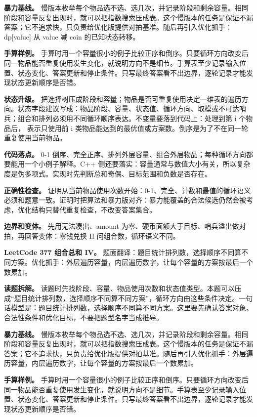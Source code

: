 \textbf{暴力基线。} 慢版本枚举每个物品选不选、选几次，并记录阶段和剩余容量。相同阶段和容量反复出现时，就可以把指数搜索压成表。这个慢版本的任务是保证不漏答案；它不追求快，只负责给优化版提供对拍基准。随后再引入优化抓手：dp[value] 从 value 减 coin 的已知状态转移。

\textbf{手算样例。} 手算时用一个容量很小的例子比较正序和倒序。只要循环方向改变后同一物品能否重复使用发生变化，就说明方向不是细节。手算表至少记录输入位置、状态变化、答案更新和停止条件。只写最终答案看不出边界，逐轮记录才能发现状态更新顺序是否错。

\textbf{状态升级。} 把选择树压成阶段和容量；物品是否可重复使用决定一维表的遍历方向。状态字段建议写成：物品阶段、容量、状态值、循环方向、取模或不可达哨兵；组合和排列必须用不同循环顺序表达。不变量要落到代码上：处理到第 i 个物品后， 表示只使用前 i 类物品能达到的最优值或方案数。倒序是为了不在同一轮重复使用当前物品。

\textbf{代码落点。} 0-1 倒序、完全正序、排列外层容量、组合外层物品；每种循环方向都要能用一个小例子解释。C++ 侧还要落实：容量通常与数值大小有关，所以复杂度是伪多项式。实现时先判断总和奇偶、目标范围和负数是否存在。

\textbf{正确性检查。} 证明从当前物品使用次数开始：0-1、完全、计数和最值的循环语义必须和题意一致。证明时把算法和暴力版对齐：暴力能覆盖的合法候选仍然会被考虑，优化结构只替代重复检查，不改变答案集合。

\textbf{边界和变体。} 先用无法凑出、amount 为零、硬币面额大于目标、哨兵溢出做对拍，再回答变体：零钱兑换 II 问组合数，循环语义不同。

\noindent\textbf{LeetCode 377 组合总和 IV。} 题面翻译：题目统计排列数，选择顺序不同算不同方案。优化抓手：外层遍历容量，内层遍历数字，让每个容量的方案按最后一个数累加。

\textbf{读题拆解。} 读题时先找阶段、容量、物品使用次数和状态值类型。本题可以压成“题目统计排列数，选择顺序不同算不同方案”，循环方向由这些条件决定。一句话模型是：题目统计排列数，选择顺序不同算不同方案。这里要先确认答案对象、合法性条件和优化目标，不要把题型名字当成推导。

\textbf{暴力基线。} 慢版本枚举每个物品选不选、选几次，并记录阶段和剩余容量。相同阶段和容量反复出现时，就可以把指数搜索压成表。这个慢版本的任务是保证不漏答案；它不追求快，只负责给优化版提供对拍基准。随后再引入优化抓手：外层遍历容量，内层遍历数字，让每个容量的方案按最后一个数累加。

\textbf{手算样例。} 手算时用一个容量很小的例子比较正序和倒序。只要循环方向改变后同一物品能否重复使用发生变化，就说明方向不是细节。手算表至少记录输入位置、状态变化、答案更新和停止条件。只写最终答案看不出边界，逐轮记录才能发现状态更新顺序是否错。


